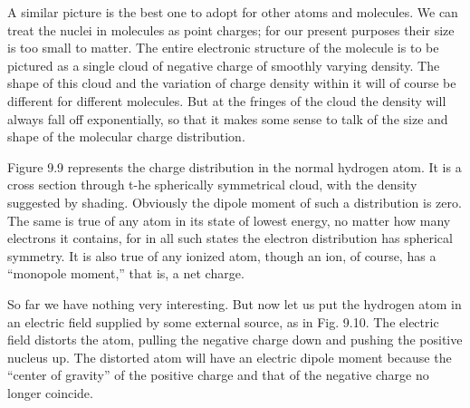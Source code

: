 A similar picture is the best one to adopt for other atoms and 
molecules. We can treat the nuclei in molecules as point charges; for our
present purposes their size is too small to matter. The entire electronic
structure of the molecule is to be pictured as a single cloud of
negative charge of smoothly varying density. The shape of this cloud
and the variation of charge density within it will of course be different
for different molecules. But at the fringes of the cloud the density
will always fall off exponentially, so that it makes some sense to talk
of the size and shape of the molecular charge distribution.

Figure 9.9 represents the charge distribution in the normal hydrogen
atom. It is a cross section through t-he spherically symmetrical
cloud, with the density suggested by shading. Obviously the dipole
moment of such a distribution is zero. The same is true of any atom
in its state of lowest energy, no matter how many electrons it 
contains, for in all such states the electron distribution has spherical
symmetry. It is also true of any ionized atom, though an ion, of
course, has a ``monopole moment,'' that is, a net charge.

So far we have nothing very interesting. But now let us put the
hydrogen atom in an electric field supplied by some external source,
as in Fig. 9.10. The electric field distorts the atom, pulling the negative
charge down and pushing the positive nucleus up. The distorted
atom will have an electric dipole moment because the ``center of
gravity'' of the positive charge and that of the negative charge no
longer coincide.

